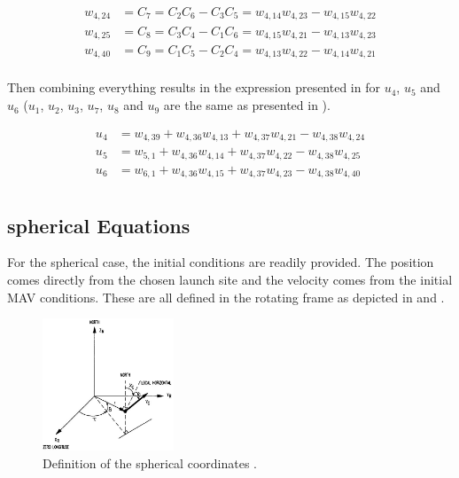 \begin{equation} \label{eq:kHatAuxF}
\begin{split}
w_{4,24} &= C_{7} = C_{2}C_{6}-C_{3}C_{5} = w_{4,14}w_{4,23}-w_{4,15}w_{4,22} \\
w_{4,25} &= C_{8} = C_{3}C_{4}-C_{1}C_{6} = w_{4,15}w_{4,21}-w_{4,13}w_{4,23}\\
w_{4,40} &= C_{9} = C_{1}C_{5}-C_{2}C_{4} = w_{4,13}w_{4,22}-w_{4,14}w_{4,21}\\
\end{split}
\end{equation}

\noindent
Then combining everything results in the expression presented in  for $u_{4}$, $u_{5}$ and $u_{6}$ ($u_{1}$, $u_{2}$, $u_{3}$, $u_{7}$, $u_{8}$ and $u_{9}$ are the same as presented in ). 

\begin{equation} \label{eq:finalAccAuxF}
\begin{split}
u_{4} &= w_{4,39}+w_{4,36}w_{4,13}+w_{4,37}w_{4,21}-w_{4,38}w_{4,24} \\
u_{5} &= w_{5,1}+w_{4,36}w_{4,14}+w_{4,37}w_{4,22}-w_{4,38}w_{4,25} \\
u_{6} &= w_{6,1}+w_{4,36}w_{4,15}+w_{4,37}w_{4,23}-w_{4,38}w_{4,40} \\
\end{split}
\end{equation}
















\subsection{spherical Equations}
\label{subsec:sphereq}
For the spherical case, the initial conditions are readily provided. The position comes directly from the chosen launch site and the velocity comes from the initial \ac{MAV} conditions. These are all defined in the rotating frame as depicted in  and .

 \begin{figure}[H]
\centering
\includegraphics[width=0.35\textwidth]{figures/tsi/spherical_mooij1994motion.jpg}
\caption{Definition of the spherical coordinates \citep{mooij1994motion}.}
\label{fig:spherical_mooij1994motion}
\end{figure}

